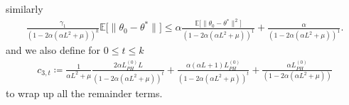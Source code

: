 \documentclass[a4paper]{article}
\newcommand{\norm}[1]{\|#1 \|}
\newcommand{\Exs}{\mathbb{E}}
\newcommand{\thetastar}{\theta^*}
\newcommand{\constLPH}[1]{L_{PH}^{(#1)}}
\newcommand{\stepsize}{\alpha}
\begin{document}
similarly
\begin{align*}
	\frac{\gamma_1}{(1 - 2 \stepsize (\stepsize L^2 + \mu))^k} \Exs \big[ \norm{\theta_0 - \thetastar} \big] \leq \stepsize \frac{\Exs \big[ \norm{\theta_0 - \thetastar}^2 \big]}{(1 - 2 \stepsize (\stepsize L^2 + \mu))^1} + \frac{\stepsize}{(1 - 2 \stepsize (\stepsize L^2 + \mu))^1}.
\end{align*}
and we also define for $0 \le t \le k$
\begin{align*}
	c_{3, t} \coloneq \frac{1}{\stepsize L^{2} + \mu}\frac{2\stepsize\constLPH{0}L}{\left(1 - 2\stepsize\left(\stepsize L^{2} + \mu\right)\right)^{t}} + \frac{\stepsize\left(\stepsize L + 1\right)\constLPH{0}}{\left(1 - 2\stepsize\left(\stepsize L^{2} + \mu\right)\right)^{t}} + \frac{\stepsize\constLPH{0}}{\left(1 - 2\stepsize\left(\stepsize L^{2} + \mu\right)\right)}
\end{align*}
to wrap up all the remainder terms.
\end{document}
